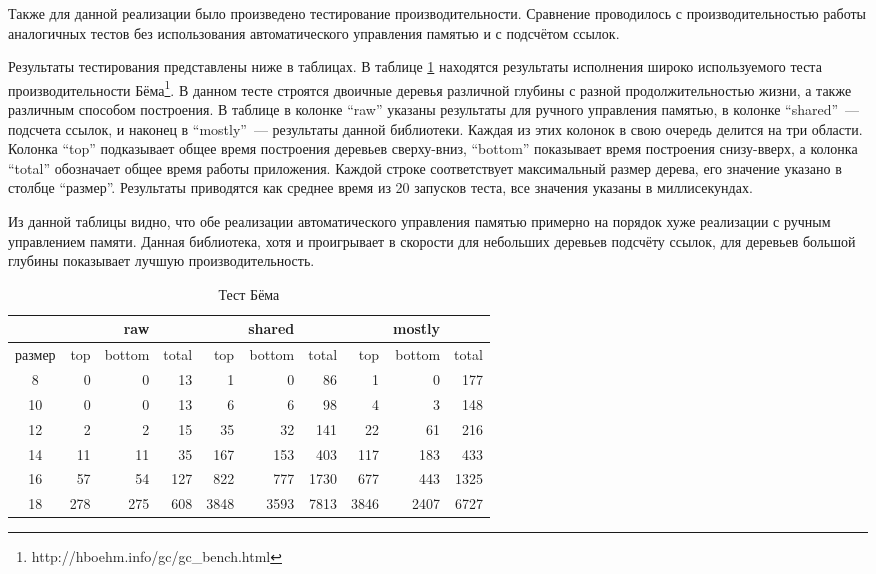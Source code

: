 Также для данной реализации было произведено тестирование производительности. Сравнение проводилось с производительностью работы аналогичных тестов без использования автоматического управления памятью и с подсчётом ссылок. 

Результаты тестирования представлены ниже в таблицах.
В таблице \ref{table:tree} находятся результаты исполнения широко используемого теста производительности Бёма\footnote{http://hboehm.info/gc/gc\_bench.html}. В данном тесте строятся двоичные деревья различной глубины с разной продолжительностью жизни, а также различным способом построения. В таблице в колонке ``raw'' указаны результаты для ручного управления памятью, в колонке ``shared''~--- подсчета ссылок, и наконец в ``mostly''~--- результаты данной библиотеки. Каждая из этих колонок в свою очередь делится на три области. Колонка ``top'' подказывает общее время построения деревьев сверху-вниз, ``bottom'' показывает время построения снизу-вверх, а колонка ``total'' обозначает общее время работы приложения. Каждой строке соответствует максимальный размер дерева, его значение указано в столбце ``размер''. Результаты приводятся как среднее время из 20 запусков теста, все значения указаны в миллисекундах.

Из данной таблицы видно, что обе реализации автоматического управления памятью примерно на порядок хуже реализации с ручным управлением памяти. Данная библиотека, хотя и проигрывает в скорости для небольших деревьев подсчёту ссылок, для деревьев большой глубины показывает лучшую производительность.

\begin{table}
\centering
\begin{tabular}{| c | r r r | r r r | r r r |} 
\hline
& & raw & & & shared & & & mostly & \\
\hline 
размер & top & bottom & total & top & bottom & total & top & bottom & total \\
\hline
8 & 0 & 0 & 13 & 1 & 0 & 86 & 1 & 0 & 177 \\
\hline
10 & 0 & 0 & 13 & 6 & 6 & 98 & 4 & 3 & 148 \\
\hline
12 & 2 & 2 & 15 & 35 & 32 & 141 & 22 & 61 & 216 \\ 
\hline
14 & 11 & 11 & 35 & 167 & 153 & 403 & 117 & 183 & 433 \\
\hline
16 & 57 & 54 & 127 & 822 & 777 & 1730 & 677 & 443 & 1325 \\ 
\hline
18 & 278 & 275 & 608 & 3848 & 3593 & 7813 & 3846 & 2407 & 6727 \\
\hline
\end{tabular}
\caption{Тест Бёма}
\label{table:tree}
\end{table}

